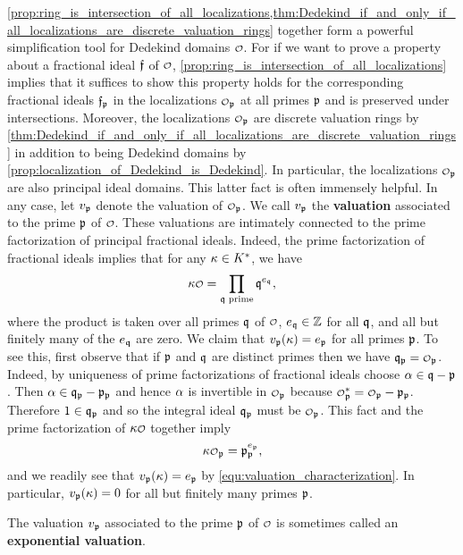    \cref{prop:ring_is_intersection_of_all_localizations,thm:Dedekind_if_and_only_if_all_localizations_are_discrete_valuation_rings} together form a powerful simplification tool for Dedekind domains $\smc{O}$. For if we want to prove a property about a fractional ideal $\mathfrak{f}$ of $\smc{O}$, \cref{prop:ring_is_intersection_of_all_localizations} implies that it suffices to show this property holds for the corresponding fractional ideals $\mathfrak{f}_{\mathfrak{p}}$ in the localizations $\smc{O}_{\mf{p}}$ at all primes $\mathfrak{p}$ and is preserved under intersections. Moreover, the localizations $\smc{O}_{\mf{p}}$ are discrete valuation rings by \cref{thm:Dedekind_if_and_only_if_all_localizations_are_discrete_valuation_rings} in addition to being Dedekind domains by \cref{prop:localization_of_Dedekind_is_Dedekind}. In particular, the localizations $\smc{O}_{\mf{p}}$ are also principal ideal domains. This latter fact is often immensely helpful. In any case, let $v_{\mathfrak{p}}$ denote the valuation of $\smc{O}_{\mf{p}}$. We call $v_{\mathfrak{p}}$ the \textbf{valuation} associated to the prime $\mathfrak{p}$ of $\smc{O}$. These valuations are intimately connected to the prime factorization of principal fractional ideals. Indeed, the prime factorization of fractional ideals implies that for any $\kappa \in K^{\ast}$, we have
    \[
      \k\smc{O} = \prod_{\text{$\mf{q}$ prime}}\mf{q}^{e_{\mf{q}}},
    \]
    where the product is taken over all primes $\mathfrak{q}$ of $\smc{O}$, $e_{\mathfrak{q}} \in \mathbb{Z}$ for all $\mathfrak{q}$, and all but finitely many of the $e_{\mathfrak{q}}$ are zero. We claim that $v_{\mathfrak{p}}(\kappa) = e_{\mathfrak{p}}$ for all primes $\mathfrak{p}$. To see this, first observe that if $\mathfrak{p}$ and $\mathfrak{q}$ are distinct primes then we have $\mf{q}_{\mf{p}} = \smc{O}_{\mf{p}}$. Indeed, by uniqueness of prime factorizations of fractional ideals choose $\alpha \in \mathfrak{q}-\mathfrak{p}$. Then $\alpha \in \mathfrak{q}_{\mathfrak{p}}-\mathfrak{p}_{\mathfrak{p}}$ and hence $\alpha$ is invertible in $\smc{O}_{\mf{p}}$ because $\smc{O}_{\mf{p}}^{\ast} = \smc{O}_{\mf{p}}-\mf{p}_{\mf{p}}$. Therefore $1 \in \mathfrak{q}_{\mathfrak{p}}$ and so the integral ideal $\mathfrak{q}_{\mathfrak{p}}$ must be $\smc{O}_{\mf{p}}$. This fact and the prime factorization of $\k\smc{O}$ together imply
    \[
      \k\smc{O}_{\mf{p}} = \mf{p}_{\mf{p}}^{e_{\mf{p}}},
    \]
    and we readily see that $v_{\mathfrak{p}}(\kappa) = e_{\mathfrak{p}}$ by \cref{equ:valuation_characterization}. In particular, $v_{\mathfrak{p}}(\kappa) = 0$ for all but finitely many primes $\mathfrak{p}$.

    \begin{remark}
      The valuation $v_{\mathfrak{p}}$ associated to the prime $\mathfrak{p}$ of $\smc{O}$ is sometimes called an \textbf{exponential valuation}.
    \end{remark}

